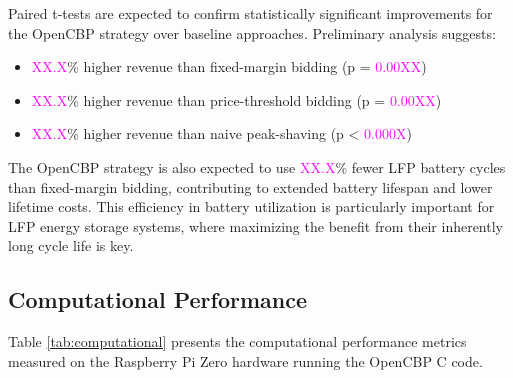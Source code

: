 \documentclass[11pt,a4paper]{article}
\begin{document}
Paired t-tests are expected to confirm statistically significant improvements for the OpenCBP strategy over baseline approaches. Preliminary analysis suggests:
\begin{itemize}
    \item \textcolor{magenta}{XX.X}\% higher revenue than fixed-margin bidding (p = \textcolor{magenta}{0.00XX})
    \item \textcolor{magenta}{XX.X}\% higher revenue than price-threshold bidding (p = \textcolor{magenta}{0.00XX})
    \item \textcolor{magenta}{XX.X}\% higher revenue than naive peak-shaving (p < \textcolor{magenta}{0.000X})
\end{itemize}

The OpenCBP strategy is also expected to use \textcolor{magenta}{XX.X}\% fewer LFP battery cycles than fixed-margin bidding, contributing to extended battery lifespan and lower lifetime costs. This efficiency in battery utilization is particularly important for LFP energy storage systems, where maximizing the benefit from their inherently long cycle life is key.

\subsection{Computational Performance}
Table \ref{tab:computational} presents the computational performance metrics measured on the Raspberry Pi Zero hardware running the OpenCBP C code.
\end{document}
